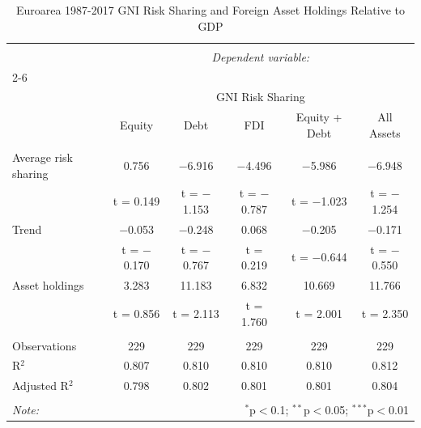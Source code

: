 
\begin{table}[!htbp] \centering 
  \caption{Euroarea 1987-2017 GNI Risk Sharing and Foreign Asset Holdings Relative to GDP} 
  \label{} 
\begin{tabular}{@{\extracolsep{5pt}}lccccc} 
\\[-1.8ex]\hline 
\hline \\[-1.8ex] 
 & \multicolumn{5}{c}{\textit{Dependent variable:}} \\ 
\cline{2-6} 
\\[-1.8ex] & \multicolumn{5}{c}{GNI Risk Sharing} \\ 
 & Equity & Debt & FDI & Equity + Debt & All Assets \\ 
\hline \\[-1.8ex] 
 Average risk sharing & 0.756 & $-$6.916 & $-$4.496 & $-$5.986 & $-$6.948 \\ 
  & t = 0.149 & t = $-$1.153 & t = $-$0.787 & t = $-$1.023 & t = $-$1.254 \\ 
  Trend & $-$0.053 & $-$0.248 & 0.068 & $-$0.205 & $-$0.171 \\ 
  & t = $-$0.170 & t = $-$0.767 & t = 0.219 & t = $-$0.644 & t = $-$0.550 \\ 
  Asset holdings & 3.283 & 11.183 & 6.832 & 10.669 & 11.766 \\ 
  & t = 0.856 & t = 2.113 & t = 1.760 & t = 2.001 & t = 2.350 \\ 
 \hline \\[-1.8ex] 
Observations & 229 & 229 & 229 & 229 & 229 \\ 
R$^{2}$ & 0.807 & 0.810 & 0.810 & 0.810 & 0.812 \\ 
Adjusted R$^{2}$ & 0.798 & 0.802 & 0.801 & 0.801 & 0.804 \\ 
\hline 
\hline \\[-1.8ex] 
\textit{Note:}  & \multicolumn{5}{r}{$^{*}$p$<$0.1; $^{**}$p$<$0.05; $^{***}$p$<$0.01} \\ 
\end{tabular} 
\end{table} 
